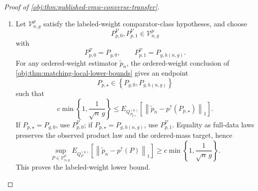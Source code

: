 \begin{proof}[Proof of \cref{obj:thm:published-vmw-converse-transfer}]
\begin{enumerate}
\item Let \(\mathcal V_{n,g}^p\) satisfy the labeled-weight comparator-class hypotheses, and choose
\[
P_{p,0}^{\mathcal V},P_{p,1}^{\mathcal V}\in\mathcal V_{n,g}^p
\]
with
\[
P_{p,0}^{\mathcal V}=P_{g,0},
\qquad
P_{p,1}^{\mathcal V}=P_{g,h(n,g)}.
\]
For any ordered-weight estimator \(\widetilde p_n\), the ordered-weight conclusion of \cref{obj:thm:matching-local-lower-bounds} gives an endpoint
\[
P_{p,\star}\in
\left\{P_{g,0},P_{g,h(n,g)}\right\}
\]
such that
\[
c\min\left\{1,\frac{1}{\sqrt n\,g}\right\}
\le
E_{Q_{P_{p,\star}}^{(n)}}\!\left[
\left\|\widetilde p_n-p^{\uparrow}(P_{p,\star})\right\|_1
\right].
\]
If \(P_{p,\star}=P_{g,0}\), use \(P_{p,0}^{\mathcal V}\); if
\(P_{p,\star}=P_{g,h(n,g)}\), use \(P_{p,1}^{\mathcal V}\).  Equality as full-data laws preserves the observed product law and the ordered-mass target, hence
\[
\sup_{P\in\mathcal V_{n,g}^p}
E_{Q_P^{(n)}}\!\left[
\left\|\widetilde p_n-p^{\uparrow}(P)\right\|_1
\right]
\ge
c\min\left\{1,\frac{1}{\sqrt n\,g}\right\}.
\]
This proves the labeled-weight lower bound. %
\end{enumerate}
\end{proof}

